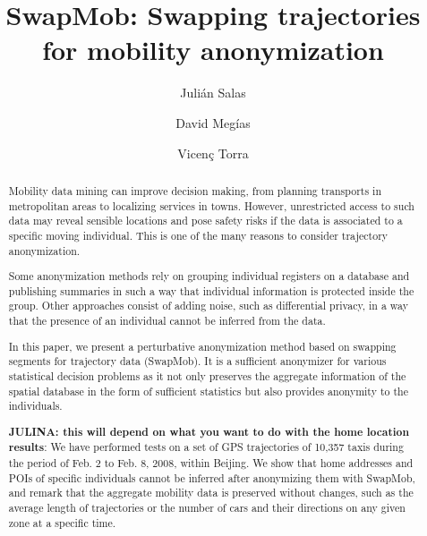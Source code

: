 \documentclass{llncs}
\begin{document}
\title{SwapMob: Swapping trajectories for mobility anonymization}
\author{Juli\'an Salas%
\and David Meg\'ias \and Vicen\c{c} Torra }


\maketitle

\begin{abstract}
%
Mobility data mining can improve decision making, from planning transports in metropolitan areas to localizing services in towns.
However, unrestricted access to such data may reveal sensible locations and pose safety risks if the data is associated to a specific moving individual. This is one of the many reasons to consider trajectory anonymization.


Some anonymization methods rely on grouping individual registers on a database and publishing summaries in such a way that individual information is protected inside the group.
Other approaches consist of adding noise, such as differential privacy, in a way that the presence of an individual cannot be inferred from the data.


In this paper, we present a perturbative anonymization method based on swapping segments for trajectory data (SwapMob). It is a sufficient anonymizer for various statistical decision problems as it not only preserves the aggregate information of the spatial database in the form of sufficient statistics but also provides anonymity to the individuals. 


	{\color{red} {\bf JULINA: this will depend on what you want to do with the home location results}: We have performed tests on a set of GPS trajectories of
  10,357 taxis during the period of Feb. 2 to Feb. 8, 2008, within
  Beijing. We show that home addresses and POIs of specific
  individuals cannot be inferred after anonymizing them with SwapMob,
  and remark that the aggregate mobility data is preserved without
  changes, such as the average length of trajectories or the number of
  cars and their directions on any given zone at a specific time.}


\end{abstract}
\end{document}
